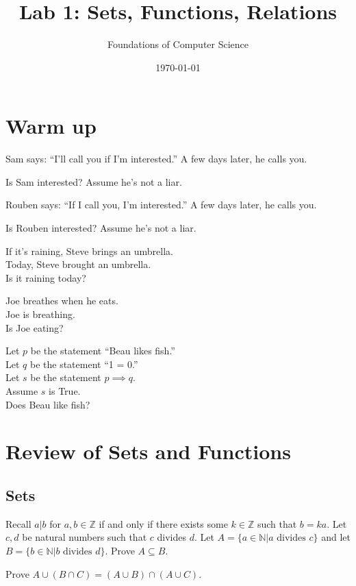 \documentclass[]{exam}
\title{Lab 1: Sets, Functions, Relations}
\author{Foundations of Computer Science}
\date{\today}
\theoremstyle{definition}
\newcommand{\bb}[1]{\mathbb{#1}}
\newcommand{\Z}{\bb{Z}}
\newcommand{\N}{\bb{N}}
\begin{document}
\maketitle

\begin{questions}

\section*{Warm up}
\question
Sam says: ``I'll call you if I'm interested.'' A few days later, he calls you.

Is Sam interested? Assume he's not a liar.

\question
Rouben says: ``If I call you, I'm interested.'' A few days later, he calls you.

Is Rouben interested? Assume he's not a liar.

\question If it's raining, Steve brings an umbrella.\\
    Today, Steve brought an umbrella.\\
    Is it raining today?

\question Joe breathes when he eats.\\
    Joe is breathing.\\
    Is Joe eating?

\question Let $p$ be the statement ``Beau likes fish.''\\
    Let $q$ be the statement ``1 = 0.''\\
    Let $s$ be the statement $p \implies q$.\\
    Assume $s$ is True.\\
    Does Beau like fish?

\section*{Review of Sets and Functions}
\subsection*{Sets}
Recall $a|b$ for $a,b \in \Z$ if and only if there exists some $k \in \Z$ such that $b = ka$.
\question Let $c, d$ be natural numbers such that $c$ divides $d$.
   Let $A = \{a \in \N| a \text{ divides } c \}$ and let\\ 
   $B = \{b \in \N| b\text{ divides }d \}$. Prove $A \subseteq B$.

\question
Prove $A \cup (B \cap C) = (A \cup B) \cap (A \cup C)$.




\end{questions}
\end{document}
